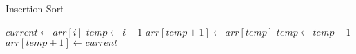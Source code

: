 \documentclass{article}
\begin{document}
\begin{algorithm}
\caption{Insertion Sort}
\begin{algorithmic}[1]
        \State $current \gets arr[i]$
        \State $temp \gets i - 1$
            \State $arr[temp + 1] \gets arr[temp]$
            \State $temp \gets temp - 1$
        \EndWhile
        \State $arr[temp + 1] \gets current$ 
    \EndFor
\EndProcedure
\end{algorithmic}
\end{algorithm}
\end{document}
